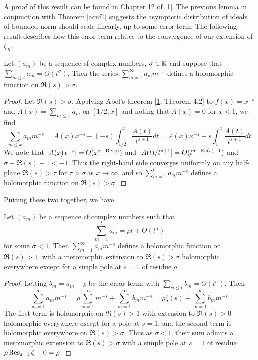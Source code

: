 \documentclass[11pt]{report}
\begin{document}
A proof of this result can be found in Chapter 12 of \hyperlink{apostol}{[1]}. The previous lemma in conjunction with Theorem \ref{acnf1} suggests the asymptotic distribution of ideals of bounded norm should scale linearly, up to some error term. The following result describes how this error term relates to the convergence of our extension of $\zeta_K$.
\begin{lemma}
    Let $(a_m)$ be a sequence of complex numbers, $\sigma \in \mathbb{R}$ and suppose that $\sum_{m \leq t} a_m = O(t^\sigma)$. Then the series $\sum_{m = 1}^\infty a_mm^{-s}$ defines a holomorphic function on $\Re(s) > \sigma$.
\end{lemma}
\begin{proof}
    Let $\Re(s) > \sigma$. Applying Abel's theorem [\hyperlink{apostol}{1}, Theorem 4.2] to $f(x) = x^{-s}$ and $A(x) = \sum_{m \leq x}a_m$ on $[1/2, x]$ and noting that $A(x) = 0$ for $x < 1$, we find
    $$
        \sum_{m \leq x}a_mm^{-s} = A(x)x^{-s} - (-s)\int_{1/2}^x \frac{A(t)}{t^{s + 1}}dt = A(x)x^{-s} + s\int_1^x\frac{A(t)}{t^{s + 1}}dt
    $$
    We note that $\left| A(x)x^{-s} \right| = O(x^{\sigma - \text{Re}(s)})$ and $\left| A(t)/t^{s + 1} \right| = O(t^{\sigma - \text{Re}(s) - 1})$ and $\sigma - \Re(s) - 1 < -1$. Thus the right-hand side converges uniformly on any half-plane $\Re(s) > \tau$ for $\tau > \sigma$ as $x \to \infty$, and so $\sum_{m = 1}^t a_mm^{-s}$ defines a holomorphic function on $\Re(s) > \sigma$.
\end{proof}
Putting these two together, we have
\begin{lemma}\label{growthrate}
    Let $(a_m)$ be a sequence of complex numbers such that
    $$
        \sum_{m = 1}^t a_m = \rho t + O(t^\sigma)
    $$
    for some $\sigma < 1$. Then $\sum_{m = 1}^\infty a_mm^{-s}$ defines a holomorphic function on $\Re(s) > 1$, with a meromorphic extension to $\Re(s) > \sigma$ holomorphic everywhere except for a simple pole at $s = 1$ of residue $\rho$.
\end{lemma}
\begin{proof}
    Letting $b_m = a_m - \rho$ be the error term, with $\sum_{m \leq t} b_m = O(t^\sigma)$. Then
    $$
        \sum_{m = 1}^\infty a_mm^{-s} = \rho\sum_{m = 1}^\infty m^{-s} + \sum_{m = 1}^\infty b_mm^{-s} = \rho\zeta(s) + \sum_{m = 1}^\infty b_mm^{-s}
    $$
    The first term is holomorphic on $\Re(s) > 1$ with extension to $\Re(s) > 0$ holomorphic everywhere except for a pole at $s = 1$, and the second term is holomorphic everywhere on $\Re(s) > \sigma$. Thus as $\sigma < 1$, their sum admits a meromorphic extension to $\Re(s) > \sigma$ with a simple pole at $s = 1$ of residue $\rho \operatorname{Res}_{s = 1}\zeta + 0 = \rho$.
\end{proof}
\end{document}

